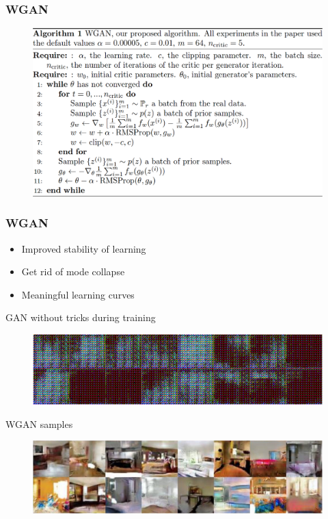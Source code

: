 \documentclass{beamer}
\begin{document}
\begin{frame}
\frametitle{WGAN}
\begin{figure}
  \includegraphics[height=.7\textheight]{WGAN_algorithm.png}
\end{figure}
\end{frame}

\begin{frame}
\frametitle{WGAN}
\begin{itemize}
\item Improved stability of learning
\item Get rid of mode collapse
\item Meaningful learning curves
\end{itemize}
GAN without tricks during training
\begin{figure}
  \includegraphics[height=.25\textheight]{GAN_wo_batchnorm.png}
\end{figure}
WGAN samples
\begin{figure}
  \includegraphics[height=.25\textheight]{WGAN_samples.png}
\end{figure}
\end{frame}
\end{document}
